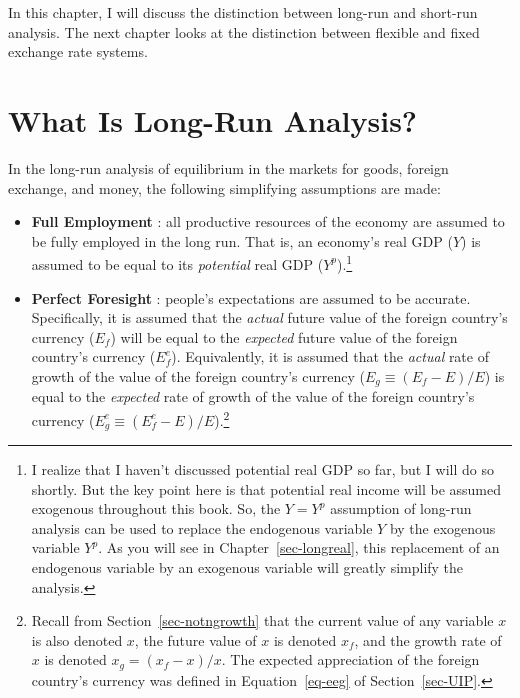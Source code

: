 \documentclass[
  letterpaper,
]{book}
\providecommand{\tightlist}{%
  \setlength{\itemsep}{0pt}\setlength{\parskip}{0pt}}\usepackage{longtable,booktabs,array}
\theoremstyle{plain}
\theoremstyle{remark}
\begin{document}
In this chapter, I will discuss the distinction between long-run and
short-run analysis. The next chapter looks at the distinction between
flexible and fixed exchange rate systems.

\section{What Is Long-Run Analysis?}\label{sec-longana}

In the long-run analysis
of equilibrium in the markets for goods, foreign exchange, and money,
the following simplifying assumptions are made:

\begin{itemize}
\tightlist
\item
  \textbf{Full Employment} : all productive
  resources of the economy are assumed to be fully employed in the long
  run. That is, an economy's real GDP (\(Y\)) is assumed to be equal to
  its \emph{potential} real GDP (\(Y^p\)).\footnote{I realize that I
    haven't discussed potential real GDP so far, but I will do so
    shortly. But the key point here is that potential real income will
    be assumed exogenous throughout this book. So, the \(Y=Y^p\)
    assumption of long-run analysis can be used to replace the
    endogenous variable \(Y\) by the exogenous variable \(Y^p\). As you
    will see in Chapter~\ref{sec-longreal}, this replacement of an
    endogenous variable by an exogenous variable will greatly simplify
    the analysis.}
\item
  \textbf{Perfect Foresight}
  : people's
  expectations are assumed to be accurate. Specifically, it is assumed
  that the \emph{actual} future value of the foreign country's currency
  (\(E_f\)) will be equal to the \emph{expected} future value of the
  foreign country's currency (\(E^e_f\)). Equivalently, it is assumed
  that the \emph{actual} rate of growth of the value of the foreign
  country's currency (\(E_g\equiv(E_f-E)/E\)) is equal to the
  \emph{expected} rate of growth of the value of the foreign country's
  currency (\(E^e_g\equiv(E^e_f-E)/E\)).\footnote{Recall from
    Section~\ref{sec-notngrowth} that the current value of any variable
    \(x\) is also denoted \(x\), the future value of \(x\) is denoted
    \(x_f\), and the growth rate of \(x\) is denoted \(x_g=(x_f-x)/x\).
    The expected appreciation of the foreign country's currency was
    defined in Equation~\ref{eq-eeg} of Section~\ref{sec-UIP}.}
\end{itemize}
\end{document}
